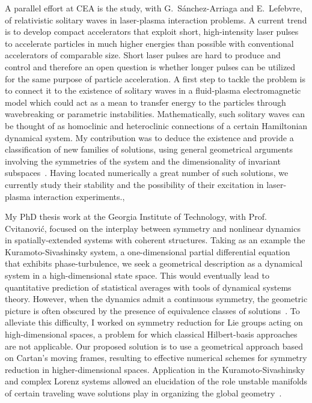\documentclass[11pt,a4paper,final]{moderncv}
\begin{document}
A parallel effort at CEA is the study, with G.~S\'anchez-Arriaga and 
E.~Lefebvre, of relativistic solitary waves in laser-plasma interaction 
problems. A current trend is to develop compact accelerators that
exploit short, high-intensity laser pulses to accelerate particles
in much higher energies than possible with conventional accelerators 
of comparable size. Short laser pulses are hard to produce and control and
therefore an open question is whether longer pulses can be utilized for
the same purpose of particle acceleration. A first step to tackle the
problem is to connect it to the existence of solitary waves 
in a fluid-plasma electromagnetic model which could act as a mean to transfer   
energy to the particles through wavebreaking or parametric instabilities. 
Mathematically, such solitary waves can be thought of as homoclinic
and heteroclinic connections of a certain Hamiltonian dynamical system.
My contribution was to deduce the existence and provide a classification of new
families of solutions, using general geometrical arguments 
involving the symmetries of the system and the dimensionality 
of invariant subspaces~\cite{SSL11}. Having located numerically a great number of such
solutions, we currently study their stability and the possibility 
of their excitation in laser-plasma interaction experiments.\sep

My PhD thesis work at the Georgia Institute of Technology, 
with Prof. Cvitanovi\'c,
focused on the interplay between symmetry and nonlinear dynamics
in spatially-extended systems with coherent structures. Taking as an example
the Kuramoto-Sivashinsky system, a one-dimensional 
partial differential equation that exhibits phase-turbulence, we seek
a geometrical description as a dynamical system in a high-dimensional 
state space. This would eventually lead to quantitative prediction of 
statistical averages with tools of dynamical systems theory. 
However, when the dynamics admit a continuous
symmetry, the geometric picture is often obscured by the presence of equivalence
classes of solutions~\cite{SCD07}. To alleviate this difficulty, I worked on symmetry
reduction for Lie groups acting on high-dimensional spaces, a problem
for which classical Hilbert-basis approaches are not applicable. Our proposed 
solution is to use a geometrical approach based on Cartan's moving frames,
resulting to effective numerical schemes for symmetry reduction 
in higher-dimensional spaces. 
Application in the Kuramoto-Sivashinsky and complex Lorenz systems 
allowed an elucidation of the role unstable manifolds of certain traveling wave 
solutions play in organizing the 
global geometry~\cite{SiCvi10,SiminosThesis}.
\end{document}
